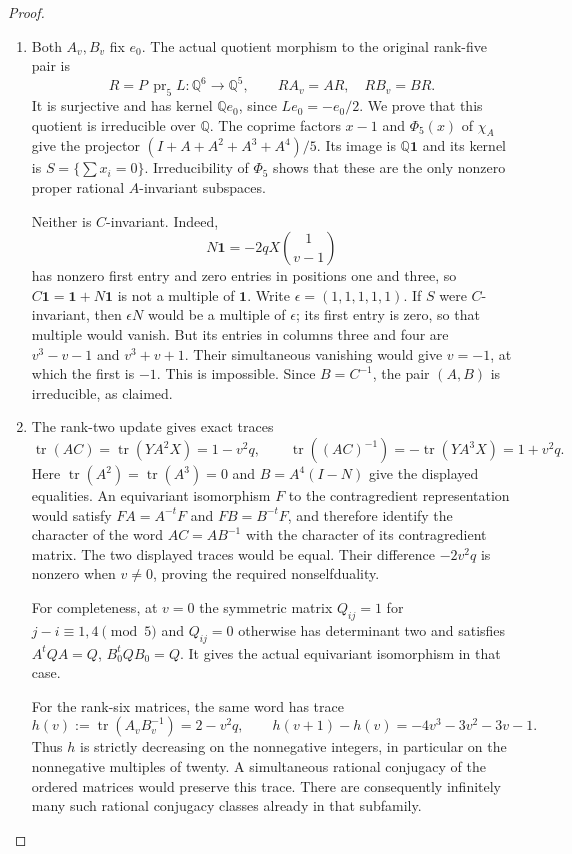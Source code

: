 \begin{proof}
\begin{enumerate}[label=\arabic*.]
\item Both $A_v,B_v$ fix $e_0$. The actual quotient morphism to
the original rank-five pair is
\[
 R=P\,\operatorname{pr}_5 L:\mathbb Q^6\longrightarrow\mathbb Q^5,
 \qquad RA_v=AR,\quad RB_v=BR.
\]
It is surjective and has kernel $\mathbb Qe_0$, since
$Le_0=-e_0/2$. We prove that this quotient is irreducible over
$\mathbb Q$. The coprime factors $x-1$ and $\Phi_5(x)$ of
$\chi_A$ give the projector
$(I+A+A^2+A^3+A^4)/5$. Its image is $\mathbb Q\mathbf1$ and
its kernel is $S=\{\sum x_i=0\}$. Irreducibility of $\Phi_5$
shows that these are the only nonzero proper rational
$A$-invariant subspaces.

Neither is $C$-invariant. Indeed,
\[
 N\mathbf1=-2qX\binom{1}{v-1}
\]
has nonzero first entry and zero entries in positions one and three,
so $C\mathbf1=\mathbf1+N\mathbf1$ is not a multiple of
$\mathbf1$. Write $\epsilon=(1,1,1,1,1)$. If $S$ were
$C$-invariant, then $\epsilon N$ would be a multiple of
$\epsilon$; its first entry is zero, so that multiple would
vanish. But its entries in columns three and four are
$v^3-v-1$ and $v^3+v+1$. Their simultaneous vanishing would
give $v=-1$, at which the first is $-1$. This is impossible.
Since $B=C^{-1}$, the pair $(A,B)$ is irreducible, as claimed.

\item The rank-two update gives exact traces
\[
 \operatorname{tr}(AC)=\operatorname{tr}(YA^2X)=1-v^2q,
 \qquad
 \operatorname{tr}((AC)^{-1})
       =-\operatorname{tr}(YA^3X)=1+v^2q.
\]
Here $\operatorname{tr}(A^2)=\operatorname{tr}(A^3)=0$ and
$B=A^4(I-N)$ give the displayed equalities. An equivariant
isomorphism $F$ to the contragredient representation would
satisfy $FA=A^{-t}F$ and $FB=B^{-t}F$, and therefore identify
the character of the word $AC=AB^{-1}$ with the character
of its contragredient matrix. The two displayed traces would
be equal. Their difference $-2v^2q$ is nonzero when $v\ne0$,
proving the required nonselfduality.

For completeness, at $v=0$ the symmetric matrix
$Q_{ij}=1$ for $j-i\equiv1,4\pmod5$ and $Q_{ij}=0$ otherwise
has determinant two and satisfies $A^tQA=Q$, $B_0^tQB_0=Q$.
It gives the actual equivariant isomorphism in that case.

For the rank-six matrices, the same word has trace
\[
 h(v):=\operatorname{tr}(A_vB_v^{-1})=2-v^2q,
 \qquad h(v+1)-h(v)=-4v^3-3v^2-3v-1.
\]
Thus $h$ is strictly decreasing on the nonnegative integers,
in particular on the nonnegative multiples of twenty.
A simultaneous rational conjugacy of the ordered matrices
would preserve this trace. There are consequently infinitely
many such rational conjugacy classes already in that subfamily.


\end{enumerate}
\end{proof}
